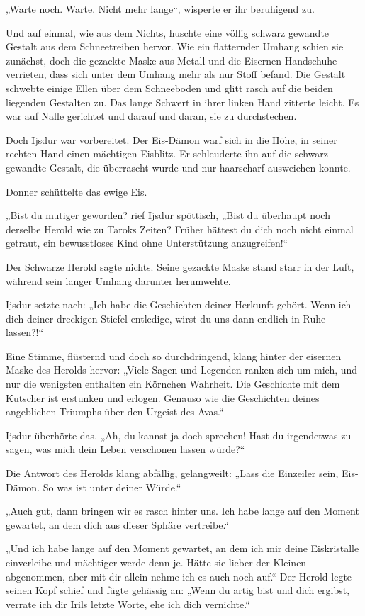 „Warte noch. Warte. Nicht mehr lange“, wisperte er ihr beruhigend zu.

Und auf einmal, wie aus dem Nichts, huschte eine völlig schwarz gewandte Gestalt aus dem Schneetreiben hervor. Wie ein flatternder Umhang schien sie zunächst, doch die gezackte Maske aus Metall und die Eisernen Handschuhe verrieten, dass sich unter dem Umhang mehr als nur Stoff befand. Die Gestalt schwebte einige Ellen über dem Schneeboden und glitt rasch auf die beiden liegenden Gestalten zu. Das lange Schwert in ihrer linken Hand zitterte leicht. Es war auf Nalle gerichtet und darauf und daran, sie zu durchstechen.

Doch Ijsdur war vorbereitet. Der Eis-Dämon warf sich in die Höhe, in seiner rechten Hand einen mächtigen Eisblitz. Er schleuderte ihn auf die schwarz gewandte Gestalt, die überrascht wurde und nur haarscharf ausweichen konnte.

Donner schüttelte das ewige Eis.

„Bist du mutiger geworden? rief Ijsdur spöttisch, „Bist du überhaupt noch derselbe Herold wie zu Taroks Zeiten? Früher hättest du dich noch nicht einmal getraut, ein bewusstloses Kind ohne Unterstützung anzugreifen!“

Der Schwarze Herold sagte nichts. Seine gezackte Maske stand starr in der Luft, während sein langer Umhang darunter herumwehte.

Ijsdur setzte nach: „Ich habe die Geschichten deiner Herkunft gehört. Wenn ich dich deiner dreckigen Stiefel entledige, wirst du uns dann endlich in Ruhe lassen?!“

Eine Stimme, flüsternd und doch so durchdringend, klang hinter der eisernen Maske des Herolds hervor: „Viele Sagen und Legenden ranken sich um mich, und nur die wenigsten enthalten ein Körnchen Wahrheit. Die Geschichte mit dem Kutscher ist erstunken und erlogen. Genauso wie die Geschichten deines angeblichen Triumphs über den Urgeist des Avas.“

Ijsdur überhörte das. „Ah, du kannst ja doch sprechen! Hast du irgendetwas zu sagen, was mich dein Leben verschonen lassen würde?“

Die Antwort des Herolds klang abfällig, gelangweilt: „Lass die Einzeiler sein, Eis-Dämon. So was ist unter deiner Würde.“

„Auch gut, dann bringen wir es rasch hinter uns. Ich habe lange auf den Moment gewartet, an dem dich aus dieser Sphäre vertreibe.“

„Und ich habe lange auf den Moment gewartet, an dem ich mir deine Eiskristalle einverleibe und mächtiger werde denn je. Hätte sie lieber der Kleinen abgenommen, aber mit dir allein nehme ich es auch noch auf.“ Der Herold legte seinen Kopf schief und fügte gehässig an: „Wenn du artig bist und dich ergibst, verrate ich dir Irils letzte Worte, ehe ich dich vernichte.“

